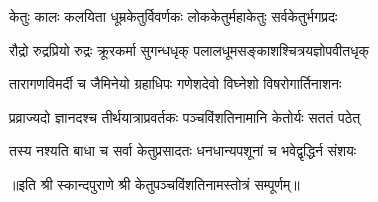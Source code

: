 

\twolineshloka
{केतुः कालः कलयिता धूम्रकेतुर्विवर्णकः}
{लोककेतुर्महाकेतुः सर्वकेतुर्भगप्रदः}

\twolineshloka
{रौद्रो रुद्रप्रियो रुद्रः क्रूरकर्मा सुगन्धधृक्}
{पलालधूमसङ्काशश्चित्रयज्ञोपवीतधृक्}

\twolineshloka
{तारागणविमर्दी च जैमिनेयो ग्रहाधिपः}
{गणेशदेवो विघ्नेशो विषरोगार्तिनाशनः}

\twolineshloka
{प्रव्राज्यदो ज्ञानदश्च तीर्थयात्राप्रवर्तकः}
{पञ्चविंशतिनामानि केतोर्यः सततं पठेत्}

\twolineshloka
{तस्य नश्यति बाधा च सर्वा केतुप्रसादतः}
{धनधान्यपशूनां च भवेद्वृद्धिर्न संशयः}

॥इति श्री स्कान्दपुराणे श्री केतुपञ्चविंशतिनामस्तोत्रं सम्पूर्णम्॥



